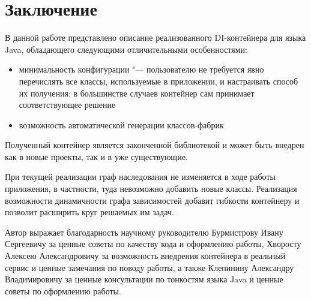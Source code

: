 \section{Заключение}

В данной работе представлено описание реализованного DI-контейнера для языка Java, обладающего следующими отличительными особенностями:

\begin{itemize}
	\item минимальность конфигурации "--- пользователю не требуется явно перечислять все классы, используемые в приложении, и настраивать способ их получения: в большинстве случаев
	контейнер сам принимает соответствующее решение
	\item возможность автоматической генерации классов-фабрик
\end{itemize}

Полученный контейнер является законченной библиотекой и может быть внедрен как в новые проекты, так и в уже существующие. 

При текущей реализации граф наследования не изменяется в ходе работы приложения, в частности, туда невозможно добавить новые классы. 
Реализация возможности динамичности графа зависимостей добавит гибкости контейнеру и позволит расширить круг решаемых им задач.

Автор выражает благодарность научному руководителю Бурмистрову Ивану Сергеевичу за ценные советы по качеству кода и оформлению работы, 
Хворосту Алексею Александровичу за возможность внедрения контейнера в реальный сервис и ценные замечания по поводу работы,
а также Клепинину Александру Владимировичу за ценные консультации по тонкостям языка Java и ценные советы по оформлению работы.